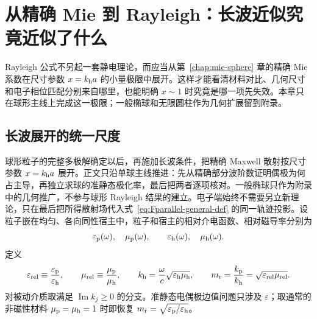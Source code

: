 \chapter{从精确 Mie 到 Rayleigh：长波近似究竟近似了什么}
\label{chap:rayleigh}

Rayleigh 公式不另起一套静电理论，而应当从第~\ref{chap:mie-sphere} 章的精确 Mie 系数在尺寸参数 $x=k_{\rm h}a$ 的小量极限中展开。这样才能看清材料对比、几何尺寸和电子相位匹配分别来自哪里，也能明确 $x\sim1$ 时究竟是哪一项先失效。本章只在球形主线上完成这一极限；一般椭球和无限圆柱作为几何扩展留到附录。

\section{长波展开的统一尺度}

球形粒子的完整多极解确定以后，再施加长波条件，把精确 Maxwell 散射按尺寸参数 $x=k_{\rm h}a$ 展开。正文只沿单球主线推进：先从精确部分波阶数证明偶极为何占主导，再独立求球的准静态极化率，最后把两者逐项核对。一般椭球只作为附录中的几何推广，不参与球形 Rayleigh 结果的建立。电子端始终不需要另立新理论，只在最后把所得散射场代入式~\eqref{eq:Fparallel-general-def} 的同一轨迹投影。设粒子嵌在均匀、各向同性宿主中，粒子和宿主的相对介电函数、相对磁导率分别为
\begin{equation}
\varepsilon_{\rm p}(\omega),\quad \mu_{\rm p}(\omega),
\qquad
\varepsilon_{\rm h}(\omega),\quad \mu_{\rm h}(\omega).
\end{equation}
定义
\begin{equation}
\varepsilon_{\rm rel}\equiv\frac{\varepsilon_{\rm p}}{\varepsilon_{\rm h}},
\qquad
\mu_{\rm rel}\equiv\frac{\mu_{\rm p}}{\mu_{\rm h}},
\qquad
k_{\rm h}=\frac{\omega}{c}
\sqrt{\varepsilon_{\rm h}\mu_{\rm h}},
\qquad
m_{\rm r}=\frac{k_{\rm p}}{k_{\rm h}}
=\sqrt{\varepsilon_{\rm rel}\mu_{\rm rel}}.
\label{eq:host-wave-number}
\end{equation}
对被动介质取满足 $\operatorname{Im}k_j\ge0$ 的分支。准静态电偶极边值问题只涉及 $\varepsilon$；取通常的非磁性材料 $\mu_{\rm p}=\mu_{\rm h}=1$ 时即恢复
$m_{\rm r}=\sqrt{\varepsilon_{\rm p}/\varepsilon_{\rm h}}$。

